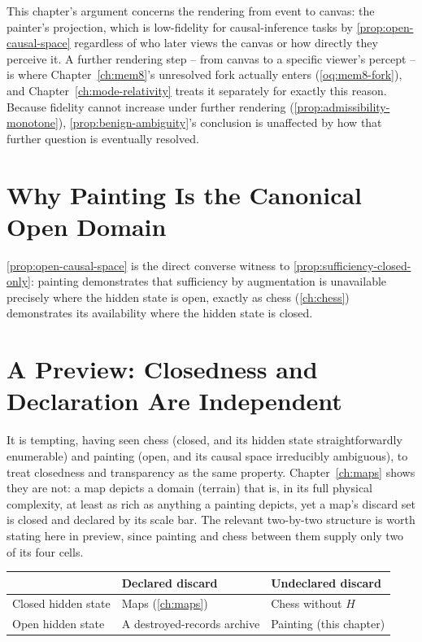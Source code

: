 \begin{remark}
\label{rem:painting-fork-independent}
This chapter's argument concerns the rendering from event to canvas: the
painter's projection, which is low-fidelity for causal-inference tasks
by \cref{prop:open-causal-space} regardless of who later views the
canvas or how directly they perceive it. A further rendering step --
from canvas to a specific viewer's percept -- is where
Chapter~\ref{ch:mem8}'s unresolved fork actually enters
(\cref{oq:mem8-fork}), and Chapter~\ref{ch:mode-relativity} treats it
separately for exactly this reason. Because fidelity cannot increase
under further rendering (\cref{prop:admissibility-monotone}),
\cref{prop:benign-ambiguity}'s conclusion is unaffected by how that
further question is eventually resolved.
\end{remark}

\section{Why Painting Is the Canonical Open Domain}

\cref{prop:open-causal-space} is the direct converse witness to
\cref{prop:sufficiency-closed-only}: painting demonstrates that
sufficiency by augmentation is unavailable precisely where the hidden
state is open, exactly as chess (\cref{ch:chess}) demonstrates its
availability where the hidden state is closed.

\section{A Preview: Closedness and Declaration Are Independent}

It is tempting, having seen chess (closed, and its hidden state
straightforwardly enumerable) and painting (open, and its causal space
irreducibly ambiguous), to treat closedness and transparency as the same
property. Chapter~\ref{ch:maps} shows they are not: a map depicts a
domain (terrain) that is, in its full physical complexity, at least as
rich as anything a painting depicts, yet a map's discard set is closed
and declared by its scale bar. The relevant two-by-two structure is worth
stating here in preview, since painting and chess between them supply
only two of its four cells.

\begin{center}
\small
\begin{tabular}{p{2.5cm}p{3.3cm}p{3.3cm}}
\toprule
& Declared discard & Undeclared discard \\
\midrule
Closed hidden state & Maps (\cref{ch:maps}) & Chess without $H$ \\
Open hidden state & A destroyed-records archive & Painting (this chapter) \\
\bottomrule
\end{tabular}
\end{center}

